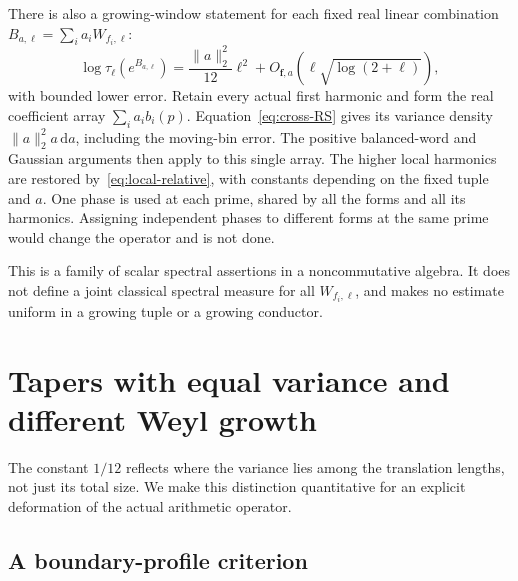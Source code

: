\documentclass[11pt,reqno]{amsart}
\numberwithin{equation}{section}
\newcommand{\dd}{\,\mathrm d}
\newcommand{\norm}[1]{\lVert#1\rVert}
\begin{document}
There is also a growing-window statement for each fixed real
linear combination $B_{a,\ell}=\sum_i a_iW_{f_i,\ell}$:
\begin{equation}\label{eq:vector-pressure}
 \log\tau_\ell(e^{B_{a,\ell}})
   =\frac{\norm a_2^2}{12}\ell^2
                +O_{\boldsymbol f,a}(\ell\sqrt{\log(2+\ell)}),
\end{equation}
with bounded lower error. Retain every actual first harmonic
and form the real coefficient array $\sum_i a_i b_i(p)$.
Equation~\eqref{eq:cross-RS} gives its variance density
$\norm a_2^2 a\dd a$, including the moving-bin error.
The positive balanced-word and Gaussian arguments then apply
to this single array. The higher local harmonics are restored
by~\eqref{eq:local-relative}, with constants depending on the
fixed tuple and $a$. One phase is used at each prime, shared
by all the forms and all its harmonics. Assigning independent
phases to different forms at the same prime would change the
operator and is not done.

This is a family of scalar spectral assertions in a noncommutative
algebra. It does not define a joint classical spectral measure
for all $W_{f_i,\ell}$, and makes no estimate uniform in a
growing tuple or a growing conductor.

\section{Tapers with equal variance and different Weyl growth}\label{sec:tapers}

The constant $1/12$ reflects where the variance lies among the
translation lengths, not just its total size. We make this
distinction quantitative for an explicit deformation of the
actual arithmetic operator.

\subsection*{A boundary-profile criterion}
\end{document}
